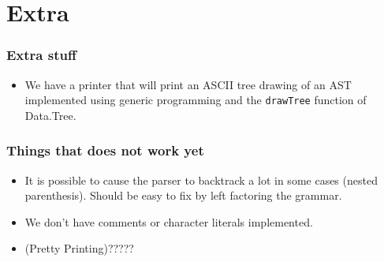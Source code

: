 \documentclass{beamer}
\begin{document}
\section{Extra}
\begin{frame}
\frametitle{Extra stuff}
\begin{itemize}
\item We have a printer that will print an ASCII tree drawing of an AST implemented using generic programming and the \lstinline{drawTree} function of Data.Tree.
\end{itemize}
\end{frame}
\begin{frame}
\frametitle{Things that does not work yet}
\begin{itemize}
\item It is possible to cause the parser to backtrack a lot in some cases (nested parenthesis). Should be easy to fix by left factoring the grammar.
\item We don't have comments or character literals implemented.
\item (Pretty Printing)?????
\end{itemize}
\end{frame}
\end{document}
